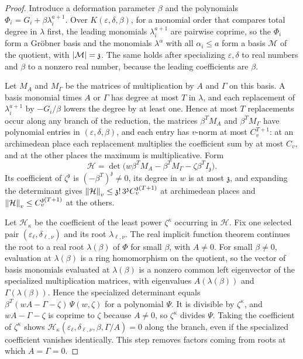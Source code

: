\begin{proof}
Introduce a deformation parameter $\beta$ and the polynomials
$\Phi_i=G_i+\beta\lambda_i^{a+1}$. Over $K(\varepsilon,\delta,\beta)$, for a
monomial order that compares total degree in $\lambda$ first, the leading
monomials $\lambda_i^{a+1}$ are pairwise coprime, so the $\Phi_i$ form a
Gr\"obner basis and the monomials $\lambda^\alpha$ with all $\alpha_i\le a$
form a basis $\mathcal M$ of the quotient, with $\left\lvert\mathcal M\right\rvert=\mathfrak z$. The same
holds after specializing $\varepsilon,\delta$ to real numbers and $\beta$ to a
nonzero real number, because the leading coefficients are $\beta$.

Let $M_A$ and $M_\Gamma$ be the matrices of multiplication by $A$ and
$\Gamma$ on this basis. A basis monomial times $A$ or $\Gamma$ has degree at
most $T$ in $\lambda$, and each replacement of $\lambda_i^{a+1}$ by
$-G_i/\beta$ lowers the degree by at least one. Hence at most $T$ replacements
occur along any branch of the reduction, the matrices $\beta^TM_A$ and
$\beta^TM_\Gamma$ have polynomial entries in $(\varepsilon,\delta,\beta)$, and
each entry has $v$-norm at most $C_v^{T+1}$: at an archimedean place each
replacement multiplies the coefficient sum by at most $C_v$, and at the other
places the maximum is multiplicative. Form
\[
\mathcal H=\det\bigl(w\beta^TM_A-\beta^TM_\Gamma-\zeta\beta^TI_{\mathfrak z}\bigr).
\]
Its coefficient of $\zeta^{\mathfrak z}$ is $(-\beta^T)^{\mathfrak z}\ne0$, its
degree in $w$ is at most $\mathfrak z$, and expanding the determinant gives
$\left\lVert\mathcal H\right\rVert_v\le\mathfrak z!\,3^{\mathfrak z}C_v^{\mathfrak z(T+1)}$ at
archimedean places and $\left\lVert\mathcal H\right\rVert_v\le C_v^{\mathfrak z(T+1)}$ at the
others.

Let $\mathcal H_\kappa$ be the coefficient of the least power $\zeta^\kappa$
occurring in $\mathcal H$. Fix one selected pair
$(\varepsilon_\ell,\delta_{\ell,\nu})$ and its root $\lambda_{\ell,\nu}$. The
real implicit function theorem continues the root to a real root
$\lambda(\beta)$ of $\Phi$ for small $\beta$, with $A\ne0$. For small
$\beta\ne0$, evaluation at $\lambda(\beta)$ is a ring homomorphism on the
quotient, so the vector of basis monomials evaluated at $\lambda(\beta)$ is a
nonzero common left eigenvector of the specialized multiplication matrices,
with eigenvalues $A(\lambda(\beta))$ and $\Gamma(\lambda(\beta))$. Hence the
specialized determinant equals $\beta^T(wA-\Gamma-\zeta)\,\Psi(w,\zeta)$ for
a polynomial $\Psi$. It is divisible by $\zeta^\kappa$, and $wA-\Gamma-\zeta$
is coprime to $\zeta$ because $A\ne0$, so $\zeta^\kappa$ divides $\Psi$.
Taking the coefficient of $\zeta^\kappa$ shows
$\mathcal H_\kappa(\varepsilon_\ell,\delta_{\ell,\nu},\beta,\Gamma/A)=0$ along
the branch, even if the specialized coefficient vanishes identically. This
step removes factors coming from roots at which $A=\Gamma=0$.


\end{proof}
